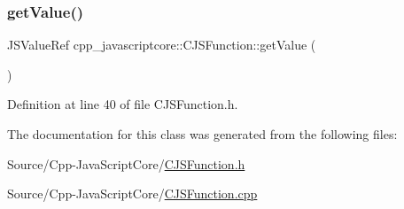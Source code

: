 \mbox{\label{classcpp__javascriptcore_1_1_c_j_s_function_aa20026ff5ca7485db637b004316094f6}} 
\subsubsection{\texorpdfstring{get\+Value()}{getValue()}}
{\footnotesize\ttfamily J\+S\+Value\+Ref cpp\+\_\+javascriptcore\+::\+C\+J\+S\+Function\+::get\+Value (\begin{DoxyParamCaption}{ }\end{DoxyParamCaption})\hspace{0.3cm}{\ttfamily [inline]}}



Definition at line 40 of file C\+J\+S\+Function.\+h.



The documentation for this class was generated from the following files\+:\begin{DoxyCompactItemize}
\item 
Source/\+Cpp-\/\+Java\+Script\+Core/\mbox{\hyperlink{_c_j_s_function_8h}{C\+J\+S\+Function.\+h}}\item 
Source/\+Cpp-\/\+Java\+Script\+Core/\mbox{\hyperlink{_c_j_s_function_8cpp}{C\+J\+S\+Function.\+cpp}}\end{DoxyCompactItemize}
